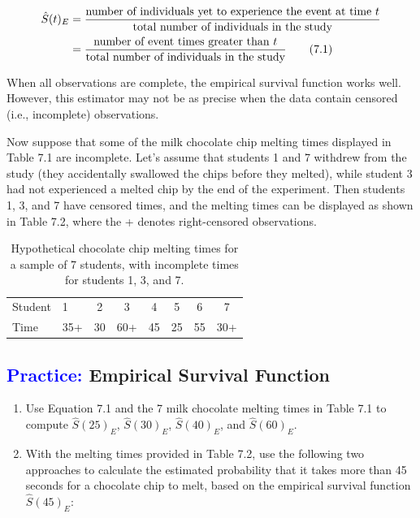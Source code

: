\documentclass[
]{report}
\begin{document}
\begin{align}\label{9.1}
\hat S(t)_{E}
&= \frac{\text{number of individuals yet to experience the event at time }t}{\text{total number of individuals in the study}} \notag \\
&= \frac{\text{number of event times greater than }t}{\text{total number of individuals in the study}}
\tag{7.1}
\end{align}

When all observations are complete, the empirical survival function works well. However, this estimator may not be as precise when the data contain censored (i.e., incomplete) observations.

Now suppose that some of the milk chocolate chip melting times displayed in Table 7.1 are incomplete. Let's assume that students 1 and 7 withdrew from the study (they accidentally swallowed the chips before they melted), while student 3 had not experienced a melted chip by the end of the experiment. Then students 1, 3, and 7 have censored times, and the melting times can be displayed as shown in Table 7.2, where the + denotes right-censored observations.

\begin{table}[!h]
\centering
\caption{\label{tab:tab92}Hypothetical chocolate chip melting times for a sample of 7 students, with incomplete times for students 1, 3, and 7.}
\centering
\begin{tabular}[t]{llcccccc}
\toprule
  &  &  &  &  &  &  & \\
\midrule
Student & 1 & 2 & 3 & 4 & 5 & 6 & 7\\
Time & 35+ & 30 & 60+ & 45 & 25 & 55 & 30+\\
\bottomrule
\end{tabular}
\end{table}

\hypertarget{empirical-survival-function}{%
\subsection*{\texorpdfstring{\textcolor{blue}{Practice:} Empirical Survival Function}{ Empirical Survival Function}}\label{empirical-survival-function}}

\begin{enumerate}
\def\labelenumi{\arabic{enumi}.}
\setcounter{enumi}{3}
\item
  Use Equation 7.1 and the 7 milk chocolate melting times in Table 7.1 to compute \(\hat S(25)_{E}\), \(\hat S(30)_{E}\), \(\hat S(40)_{E}\), and \(\hat S(60)_{E}\).
\item
  With the melting times provided in Table 7.2, use the following two approaches to calculate the estimated probability that it takes more than 45 seconds for a chocolate chip to melt, based on the empirical survival function \(\hat S(45)_{E}\):\\
\end{enumerate}
\end{document}
